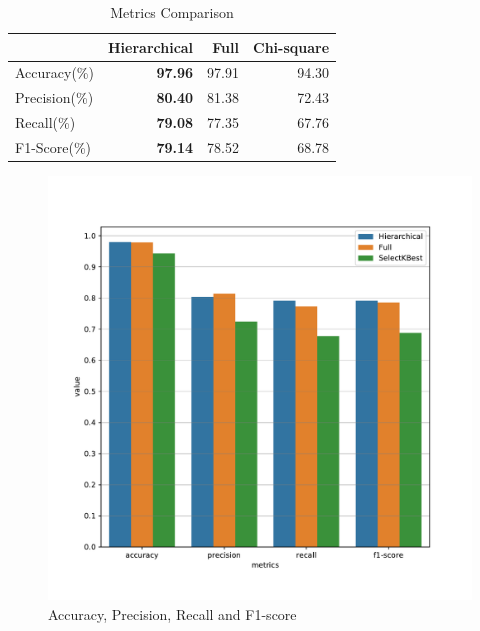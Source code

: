 \documentclass[journal]{IEEEtran}
\begin{document}
\begin{table}[!htpb]
    \caption{Metrics Comparison}
    \label{tab:metrics}
    \centering
    \begin{tabular}{lrrr}
    \toprule
        & Hierarchical & Full & Chi-square \\
    \midrule
    Accuracy(\%) & \textbf{97.96} & 97.91 & 94.30 \\
    Precision(\%) & \textbf{80.40} & 81.38 & 72.43 \\
    Recall(\%) & \textbf{79.08} & 77.35 & 67.76 \\
    F1-Score(\%) & \textbf{79.14} & 78.52 & 68.78 \\
    \bottomrule
    \end{tabular}
\end{table}

\begin{figure}[!htbp]
    \centering
    \includegraphics[scale=0.4]{fig/metrics.pdf}
    \caption{Accuracy, Precision, Recall and F1-score}
    \label{fig:metrics}
\end{figure}
\end{document}
